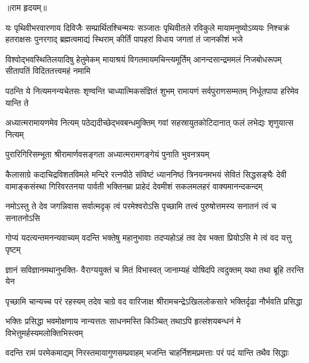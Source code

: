 



॥राम हृदयम्॥

\fourlineindentedshloka
{यः पृथिवीभरवारणाय दिविजैः सम्प्रार्थितश्चिन्मयः}
{सञ्जातः पृथिवीतले रविकुले मायामनुष्योऽव्ययः}
{निश्चक्रं हतराक्षसः पुनरगाद् ब्रह्मत्वमाद्यं स्थिराम्}
{कीर्तिं पापहरां विधाय जगतां तं जानकीशं भजे} %

\fourlineindentedshloka
{विश्वोद्भवस्थितिलयादिषु हेतुमेकम्}
{मायाश्रयं विगतमायमचिन्त्यमूर्तिम्}
{आनन्दसान्द्रममलं निजबोधरूपम्}
{सीतापतिं विदिततत्त्वमहं नमामि} %

\fourlineindentedshloka
{पठन्ति ये नित्यमनन्यचेतसः}
{शृण्वन्ति चाध्यात्मिकसंज्ञितं शुभम्}
{रामायणं सर्वपुराणसम्मतम्}
{निर्धूतपापा हरिमेव यान्ति ते} %

\fourlineindentedshloka
{अध्यात्मरामायणमेव नित्यम्}
{पठेद्यदीच्छेद्भवबन्धमुक्तिम्}
{गवां सहस्रायुतकोटिदानात्}
{फलं लभेद्यः शृणुयात्स नित्यम्} %

\twolineshloka
{पुरारिगिरिसम्भूता श्रीरामार्णवसङ्गता}
{अध्यात्मरामगङ्गेयं पुनाति भुवनत्रयम्} %

\fourlineindentedshloka
{कैलासाग्रे कदाचिद्रविशतविमले मन्दिरे रत्नपीठे}
{संविष्टं ध्याननिष्ठं त्रिनयनमभयं सेवितं सिद्धसङ्घैः}
{देवी वामाङ्कसंस्था गिरिवरतनया पार्वती भक्तिनम्रा}
{प्राहेदं देवमीशं सकलमलहरं वाक्यमानन्दकन्दम्} %


\fourlineindentedshloka
{नमोऽस्तु ते देव जगन्निवास}
{सर्वात्मदृक् त्वं परमेश्वरोऽसि}
{पृच्छामि तत्त्वं पुरुषोत्तमस्य}
{सनातनं त्वं च सनातनोऽसि} %

\fourlineindentedshloka
{गोप्यं यदत्यन्तमनन्यवाच्यम्}
{वदन्ति भक्तेषु महानुभावाः}
{तदप्यहोऽहं तव देव भक्ता}
{प्रियोऽसि मे त्वं वद यत्तु पृष्टम्} %

\fourlineindentedshloka
{ज्ञानं सविज्ञानमथानुभक्ति-}
{वैराग्ययुक्तं च मितं विभास्वत्}
{जानाम्यहं योषिदपि त्वदुक्तम्}
{यथा तथा ब्रूहि तरन्ति येन} %

\fourlineindentedshloka
{पृच्छामि चान्यच्च परं रहस्यम्}
{तदेव चाग्रे वद वारिजाक्ष}
{श्रीरामचन्द्रेऽखिललोकसारे}
{भक्तिर्दृढा नौर्भवति प्रसिद्धा} %

\fourlineindentedshloka
{भक्तिः प्रसिद्धा भवमोक्षणाय}
{नान्यत्ततः साधनमस्ति किञ्चित्}
{तथाऽपि हृत्संशयबन्धनं मे}
{विभेत्तुमर्हस्यमलोक्तिभिस्त्वम्} %

\fourlineindentedshloka
{वदन्ति रामं परमेकमाद्यम्}
{निरस्तमायागुणसम्प्रवाहम्}
{भजन्ति चाहर्निशमप्रमत्ताः}
{परं पदं यान्ति तथैव सिद्धाः} %

